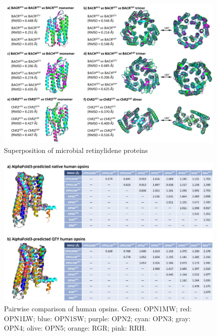 \documentclass[fleqn,10pt,lineno]{manuscript}
\begin{document}
\begin{figure}[htbp]
	\centering
	\includegraphics[width=\linewidth]{Figures/superposition-microbial.jpg}
	\caption{Superposition of microbial retinylidene proteins}
	\label{fig:microbialsup}
\end{figure}

\begin{figure}[htbp]
	\centering
	\includegraphics[width=\linewidth]{Figures/pairwise.jpg}
	\caption{Pairwise comparison of human opsins. Green: OPN1MW; red: OPN1LW; blue: OPN1SW; purple: OPN2; cyan: OPN3; gray: OPN4; olive: OPN5; orange: RGR; pink: RRH. }
	\label{fig:pairwise}
\end{figure}
\end{document}
